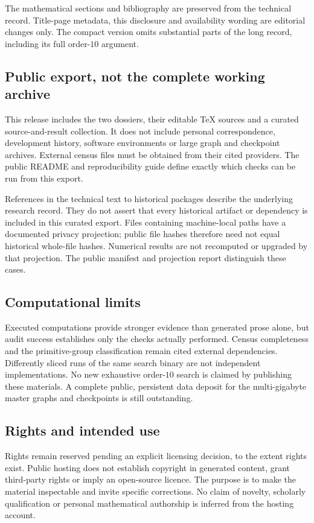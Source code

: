 The mathematical sections and bibliography are preserved from the technical
record. Title-page metadata, this disclosure and availability wording are
editorial changes only. The compact version omits substantial parts of the
long record, including its full order-$10$ argument.

\subsection*{Public export, not the complete working archive}
This release includes the two dossiers, their editable TeX sources and a
curated source-and-result collection. It does not include personal
correspondence, development history, software environments or large graph
and checkpoint archives. External census files must be obtained from their
cited providers. The public README and reproducibility guide define exactly
which checks can be run from this export.

References in the technical text to historical packages describe the
underlying research record. They do not assert that every historical
artifact or dependency is included in this curated export. Files containing
machine-local paths have a documented privacy projection; public file hashes
therefore need not equal historical whole-file hashes. Numerical results
are not recomputed or upgraded by that projection. The public manifest and
projection report distinguish these cases.

\subsection*{Computational limits}
Executed computations provide stronger evidence than generated prose alone,
but audit success establishes only the checks actually performed. Census
completeness and the primitive-group classification remain cited external
dependencies. Differently sliced runs of the same search binary are not
independent implementations. No new exhaustive order-$10$ search is claimed
by publishing these materials. A complete public, persistent data deposit
for the multi-gigabyte master graphs and checkpoints is still outstanding.

\subsection*{Rights and intended use}
Rights remain reserved pending an explicit licensing decision, to the extent
rights exist. Public hosting does not establish copyright in generated
content, grant third-party rights or imply an open-source licence.
The purpose is to make the material inspectable and invite specific
corrections. No claim of novelty, scholarly qualification or personal
mathematical authorship is inferred from the hosting account.
\clearpage
{}
